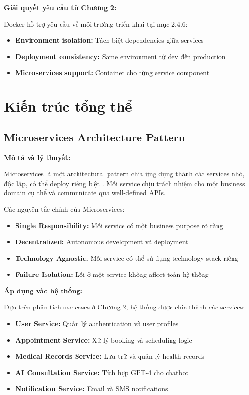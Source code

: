 \documentclass[../DoAn.tex]{subfiles}
\begin{document}
\textbf{Giải quyết yêu cầu từ Chương 2:}

Docker hỗ trợ yêu cầu về môi trường triển khai tại mục 2.4.6:
\begin{itemize}
    \item \textbf{Environment isolation:} Tách biệt dependencies giữa services
    \item \textbf{Deployment consistency:} Same environment từ dev đến production
    \item \textbf{Microservices support:} Container cho từng service component
\end{itemize}

\section{Kiến trúc tổng thể}
\label{section:3.8}

\subsection{Microservices Architecture Pattern}
\label{subsection:3.8.1}

\textbf{Mô tả và lý thuyết:}

Microservices là một architectural pattern chia ứng dụng thành các services nhỏ, độc lập, có thể deploy riêng biệt \cite{microservices}. Mỗi service chịu trách nhiệm cho một business domain cụ thể và communicate qua well-defined APIs.

Các nguyên tắc chính của Microservices:
\begin{itemize}
    \item \textbf{Single Responsibility:} Mỗi service có một business purpose rõ ràng
    \item \textbf{Decentralized:} Autonomous development và deployment
    \item \textbf{Technology Agnostic:} Mỗi service có thể sử dụng technology stack riêng
    \item \textbf{Failure Isolation:} Lỗi ở một service không affect toàn hệ thống
\end{itemize}

\textbf{Áp dụng vào hệ thống:}

Dựa trên phân tích use cases ở Chương 2, hệ thống được chia thành các services:
\begin{itemize}
    \item \textbf{User Service:} Quản lý authentication và user profiles
    \item \textbf{Appointment Service:} Xử lý booking và scheduling logic
    \item \textbf{Medical Records Service:} Lưu trữ và quản lý health records
    \item \textbf{AI Consultation Service:} Tích hợp GPT-4 cho chatbot
    \item \textbf{Notification Service:} Email và SMS notifications
\end{itemize}
\end{document}
